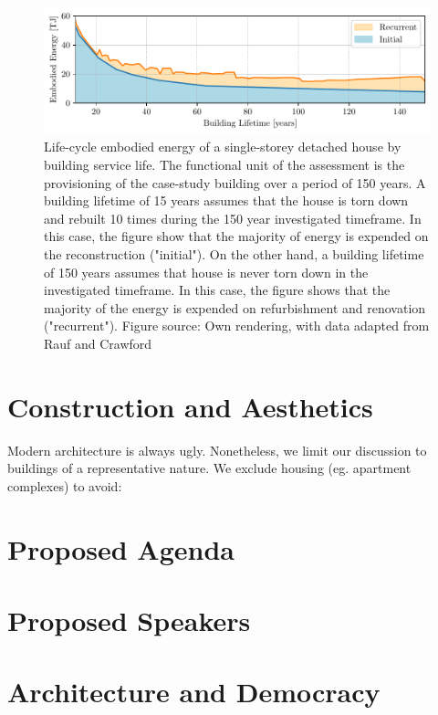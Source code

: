 \documentclass{article}
\begin{document}
\begin{figure}[ht!]
    \includegraphics[width=\textwidth]{./figures/building_embodied_energy.pdf}
    \caption{
        Life-cycle embodied energy of a single-storey detached house by building service life. The functional unit of the assessment is the provisioning of the case-study building over a period of 150 years. A building lifetime of 15 years assumes that the house is torn down and rebuilt 10 times during the 150 year investigated timeframe. In this case, the figure show that the majority of energy is expended on the reconstruction ("initial"). On the other hand, a building lifetime of 150 years assumes that house is never torn down in the investigated timeframe. In this case, the figure shows that the majority of the energy is expended on refurbishment and renovation ("recurrent").
        \newline Figure source: Own rendering, with data adapted from Rauf and Crawford \cite[Figure 5]{rauf_building_2015}
    }
    \label{fig:energy}
\end{figure}

\section{Construction and Aesthetics}

Modern architecture is always ugly. Nonetheless, we limit our discussion to buildings of a representative nature. We exclude housing (eg. apartment complexes) to avoid:

\section{Proposed Agenda}

\section{Proposed Speakers}

\clearpage
\section{Architecture and Democracy}
\end{document}
